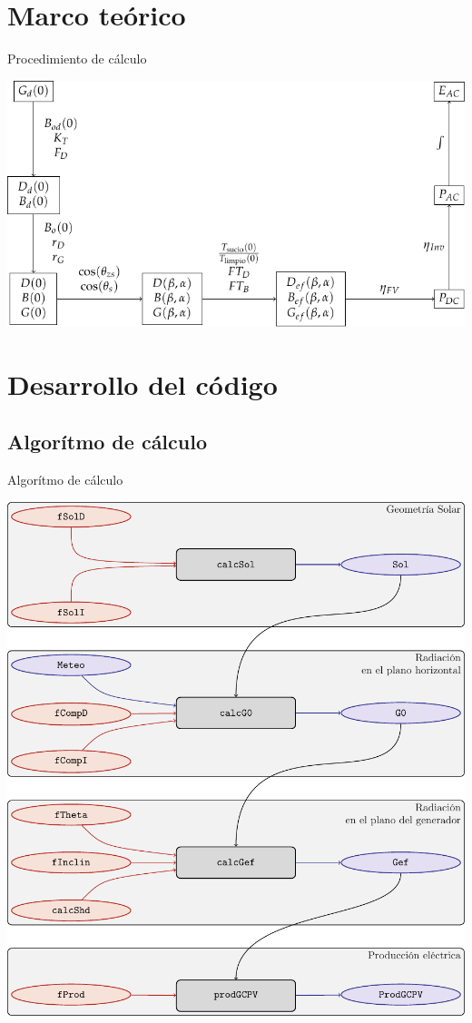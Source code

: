 \documentclass[aspectratio=169, usenames,svgnames,dvipsnames]{beamer}
\begin{document}
\section{Marco teórico}
\label{sec:org4c12abd}
\begin{frame}[label={sec:org2c5bcd2}]{Procedimiento de cálculo}
\begin{center}
\includegraphics[scale=1]{../figuras/ProcedimientoCalculoRadiacionInclinada.pdf}
\end{center}
\end{frame}
\section{Desarrollo del código}
\label{sec:org480f134}
\subsection{Algorítmo de cálculo}
\label{sec:org869d159}
\begin{frame}[label={sec:orgadc6bbe}]{Algorítmo de cálculo}
\begin{center}
\includegraphics[height=0.9\textheight]{../figuras/procedure.pdf}
\end{center}
\end{frame}
\end{document}
